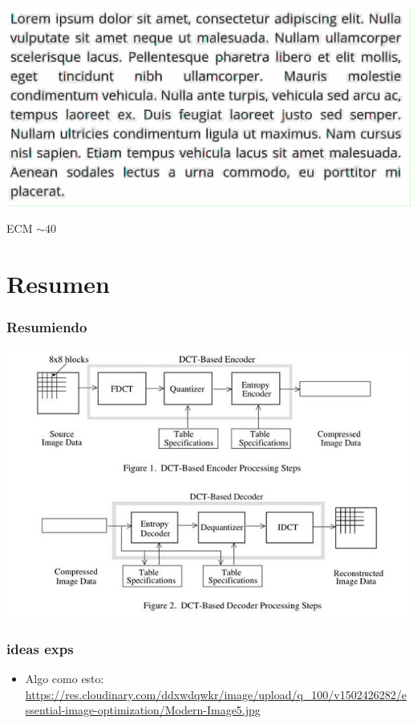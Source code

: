 \documentclass{beamer}
\begin{document}
\begin{frame}
    \begin{center}
        \includegraphics[scale=0.2]{fig/txt_80.png}


        \vfill
        {\small ECM $\sim 40$}

    \end{center}

\end{frame}


\section{Resumen}
\begin{frame}
    \frametitle{Resumiendo}
    \begin{center}
        \includegraphics[scale=0.45]{fig/steps.jpeg}
    \end{center}
\end{frame}

\begin{frame}
    \frametitle{ideas exps}
    \begin{itemize}
        \item Algo como esto:
            \url{https://res.cloudinary.com/ddxwdqwkr/image/upload/q_100/v1502426282/essential-image-optimization/Modern-Image5.jpg}
    \end{itemize}

\end{frame}
\end{document}
